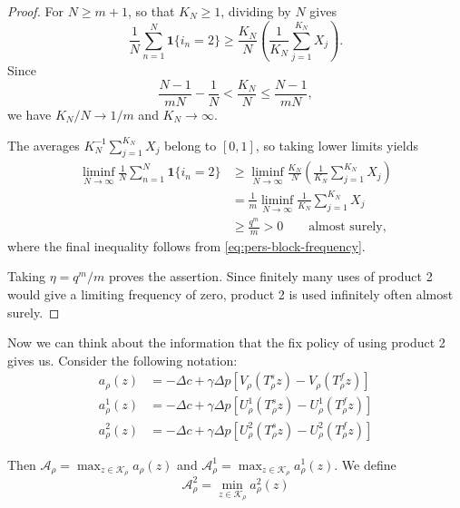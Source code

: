 \documentclass[11pt]{article}
\begin{document}
\begin{proof}
For $N\ge m+1$, so that $K_N\ge1$, dividing by $N$ gives
\begin{equation*}
\frac{1}{N}\sum_{n=1}^{N}\mathbf 1\{i_n=2\}
\ge
\frac{K_N}{N}
\left(
\frac{1}{K_N}\sum_{j=1}^{K_N}X_j
\right).
\end{equation*}
Since
\begin{equation*}
\frac{N-1}{mN}-\frac{1}{N}
<
\frac{K_N}{N}
\le
\frac{N-1}{mN},
\end{equation*}
we have $K_N/N\to1/m$ and $K_N\to\infty$.

The averages
$K_N^{-1}\sum_{j=1}^{K_N}X_j$ belong to $[0,1]$,
so taking lower limits yields
\begin{equation*}
\begin{aligned}
\liminf_{N\to\infty}
\frac{1}{N}\sum_{n=1}^{N}\mathbf 1\{i_n=2\}
&\ge
\liminf_{N\to\infty}
\frac{K_N}{N}
\left(
\frac{1}{K_N}\sum_{j=1}^{K_N}X_j
\right)\\
&=
\frac{1}{m}
\liminf_{N\to\infty}
\frac{1}{K_N}\sum_{j=1}^{K_N}X_j\\
&\ge
\frac{q^m}{m}>0
\qquad\text{almost surely},
\end{aligned}
\end{equation*}
where the final inequality follows from
\eqref{eq:pers-block-frequency}.

Taking $\eta=q^m/m$ proves the assertion.
Since finitely many uses of product 2 would give a limiting
frequency of zero, product 2 is used infinitely often
almost surely.
\end{proof}


Now we can think about the information that the fix policy of using product 2 gives us. Consider the following notation:
\begin{align}
    a_\rho(z) &= -\Delta c + \gamma \Delta p \left[V_\rho(T_\rho^s z)-V_\rho(T_\rho^f z)\right] \\
    a^1_\rho(z) &= -\Delta c + \gamma \Delta p\left[U_\rho^1(T_\rho^s z)-U_\rho^1(T_\rho^f z)\right] \\
    a^2_\rho(z) &= -\Delta c + \gamma \Delta p\left[U_\rho^2(T_\rho^s z)-U_\rho^2(T_\rho^f z)\right]
\end{align}

Then $\mathcal A_\rho = \max_{z\in\mathcal K_\rho} a_\rho(z)$ and $\mathcal A_\rho^1 = \max_{z\in\mathcal K_\rho} a^1 _\rho(z)$. We define 
\begin{equation}
    \mathcal A_\rho^2 = \min_{z\in\mathcal K_\rho} a^2_\rho(z)
\end{equation}
\end{document}
